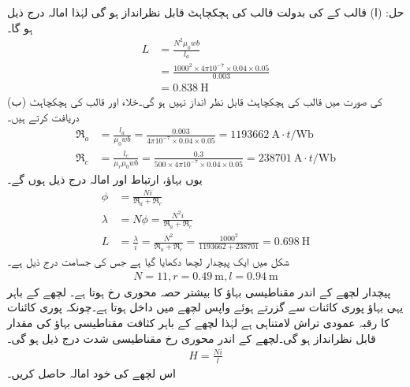حل:\quad
(ا) \quad 
 قالب کے   کی بدولت قالب کی ہچکچاہٹ قابل نظرانداز ہو گی لہٰذا  امالہ درج ذیل ہو گا۔
\begin{align*}
L&=\frac{N^2 \mu_0 w b}{l_a}\\
&=\frac{1000^2 \times 4 \pi 10^{-7} \times 0.04 \times 0.05}{0.003}\\
&=\SI{0.838}{\henry}
\end{align*}
(ب) \quad
  کی صورت میں قالب کی ہچکچاہٹ قابل نظر انداز نہیں ہو گی۔خلاء اور قالب کی ہچکچاہٹ  دریافت کرتے ہیں۔
\begin{align*}
\Re_a&=\frac{l_a}{\mu_0 w b}=\frac{0.003}{4\pi 10^{-7} \times 0.04 \times 0.05}=\SI{1193662}{\ampere \cdot t \per \weber}\\
\Re_c&=\frac{l_c}{\mu_r \mu_0 w b}=\frac{0.3}{500 \times 4\pi 10^{-7} \times 0.04 \times 0.05}=\SI{238701}{\ampere \cdot t \per \weber}
\end{align*}
یوں بہاؤ، ارتباط اور امالہ درج ذیل ہوں گے۔
\begin{align*}
\phi&=\frac{N i}{\Re_a+\Re_c}\\
\lambda &= N \phi = \frac{N^2 i}{\Re_a+\Re_c}\\
L&=\frac{\lambda}{i}=\frac{N^2}{\Re_a+\Re_c}=\frac{1000^2}{\num{1193662}+\num{238701}}=\SI{0.698}{\henry}
\end{align*}
%
شکل  میں ایک پیچدار لچھا دکھایا گیا ہے جس کی جسامت درج ذیل ہے۔
\begin{align*}
N=11, r=\SI{0.49}{\meter},l=\SI{0.94}{\meter}
\end{align*}
پیچدار لچھے  کے اندر مقناطیسی بہاؤ  کا بیشتر حصہ محوری رخ ہوتا ہے۔ لچھے کے باہر یہی بہاؤ پوری کائنات سے گزرتے ہوئے واپس لچھے میں داخل ہوتا ہے۔چونکہ پوری کائنات کا رقبہ عمودی تراش  لامتناہی ہے لہٰذا لچھے کے باہر کثافت مقناطیسی بہاؤ  کی مقدار قابل نظرانداز ہو گی۔لچھے کے اندر محوری رخ مقناطیسی شدت درج ذیل ہو گی۔
\begin{align*}
H=\frac{N i}{l}
\end{align*}
اس لچھے کی خود امالہ حاصل کریں۔
